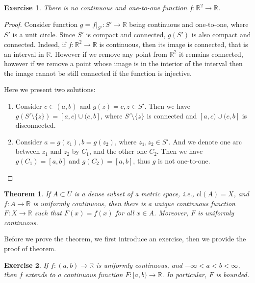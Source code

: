 \documentclass[12pt,leqno]{amsart}
\newtheorem{theorem}{Theorem}[section]
\newtheorem{exercise}{Exercise}[section]
\theoremstyle{definition}
\numberwithin{equation}{subsection}
\begin{document}
\medskip

\begin{exercise}
There is no continuous and one-to-one function $f:\mathbb{R}^2\to\mathbb{R}$.
\end{exercise}
\begin{proof}
Consider function $g = f|_{S'}: S'\to\mathbb{R}$ being continuous and one-to-one, where $S'$ is a unit circle. Since $S'$ is compact and connected, $g(S')$ is also compact and connected. Indeed, if $f:\mathbb{R}^2\to\mathbb{R}$ is continuous, then its image is connected, that is an interval in $\mathbb{R}$. However if we remove any point from $\mathbb{R}^2$ it remains connected, however if we remove a point whose image is in the interior of the interval then the image cannot be still connected if the function is injective.

Here we present two solutions:
\begin{enumerate}
    \item Consider $c \in (a,b)$ and $g(z) = c, z\in S'$. Then we have $g(S'\setminus \{z\}) = [a,c)\cup (c,b]$, where $S'\setminus \{z\}$ is connected and $[a,c)\cup (c,b]$ is disconnected.
    \item Consider $a = g(z_1), b = g(z_2)$, where $z_1, z_2\in S'$. And we denote one arc between $z_1$ and $z_2$ by $C_1$, and the other one $C_2$. Then we have $g(C_1) = [a,b]$ and $g(C_2) = [a,b]$, thus $g$ is not one-to-one.
\end{enumerate}
\end{proof}

\medskip

\begin{theorem}
If $A\subset U$ is a dense subset of a metric space, i.e., $\text{cl}(A) = X$, and $f:A\to\mathbb{R}$ is uniformly continuous, then there is a unique continuous function $F:X\to\mathbb{R}$ such that $F(x) = f(x)$ for all $x\in A$. Moreover, $F$ is uniformly continuous.
\end{theorem}

Before we prove the theorem, we first introduce an exercise, then we provide the proof of theorem.

\begin{exercise}
If $f:(a,b)\to\mathbb{R}$ is uniformly continuous, and $-\infty < a < b < \infty$, then $f$ extends to a continuous function $F:[a,b)\to\mathbb{R}$. In particular, $F$ is bounded.
\end{exercise}
\end{document}
